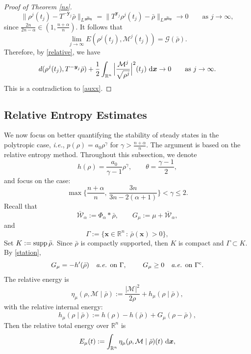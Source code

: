 \documentclass[reqno,11pt]{amsart}
\numberwithin{equation}{section}
\theoremstyle{definition}
\def\dd{{\, \rm d}}
\def\supp{{\rm supp}}
\begin{document}
\begin{proof}[Proof of Theorem \ref{ns}]
\begin{equation*}
 \| \rho^j(t_j) - T^{-\boldsymbol{y}_j} \bar{\rho} \|_{L^\frac{2n}{2n - \alpha}} 
 =  \| T^{\boldsymbol{y}_j} \rho^j(t_j) - \bar{\rho} \|_{L^\frac{2n}{2n - \alpha}} 
\rightarrow 0 \qquad\mbox{as $j \to \infty$},
\end{equation*}
since $\frac{2n}{2n - \alpha} \in (1, \frac{n + \alpha}{n})$. 
It follows that
\begin{equation*}
 \lim_{j \to \infty} E(\rho^j(t_j),\mathcal{M}^j(t_j)) = \mathcal{G}(\bar{\rho}).
\end{equation*}
Therefore, by \eqref{relative}, we have 
\begin{equation*}
 d(\rho^j(t_j),T^{-\boldsymbol{y}_j}\bar{\rho}) 
 + \frac{1}{2}\int_{\mathbb{R}^n}   
 \Big|\frac{\mathcal{M}^j}{\sqrt{\rho^j}}\Big|^2(t_j)\,\dd \boldsymbol{x} \rightarrow 0 
 \qquad \mbox{as $j \to \infty$}. 
\end{equation*}
This is a contradiction to \eqref{auxx}.
\end{proof}

\subsection{Relative Entropy Estimates}
We now focus on better quantifying the stability of steady states in the polytropic case, {\it i.e.}, $p(\rho) = a_0 \rho^\gamma$ for $\gamma > \frac{n + \alpha}{n}$. The argument is based on the relative entropy method. Throughout this subsection, we denote
\[ h(\rho)=\frac{a_0}{\gamma-1}\rho^\gamma,\qquad\theta=\frac{\gamma-1}{2},
\]
and focus on the case:
\[\max\big\{\frac{n+\alpha}{n},\,\frac{3n}{3n-2(\alpha+1)}\big\}<\gamma\le2.
\]
Recall that
\[\bar{\mathcal W}_\alpha:=\Phi_\alpha*\bar\rho, \qquad
 G_\mu:=\mu+\bar{\mathcal W}_\alpha,
\]
and 
$$ \Gamma:=\{\boldsymbol{x}\in\mathbb R^n\,:\,\bar\rho(\boldsymbol{x})>0\},$$
Set $K:=\supp  \,\bar \rho.$ 
Since $\bar\rho$ is compactly supported, then $K$ is compact and $\Gamma\subset K.$ 
By \eqref{station},
\begin{equation}\label{property}
G_\mu=-h'(\bar\rho)\quad\hbox{{\it a.e. }on } \Gamma, \qquad\,\, G_\mu\ge0\quad\hbox{{\it a.e. }on }\Gamma^{\rm c}.
\end{equation}
The relative energy is
$$
\eta_\mu(\rho,\mathcal M\mid\bar\rho) :=\frac{|\mathcal M|^2}{2\rho}+h_\mu(\rho\mid\bar\rho),
$$
with 
the relative internal energy:
\begin{equation}\nonumber
h_\mu(\rho\mid\bar\rho):=h(\rho)-h(\bar\rho)+G_\mu(\rho-\bar\rho),
\end{equation}
Then the relative total energy over $\mathbb{R}^n$ is
$$
E_\mu(t):=\int_{\mathbb R^n}\eta_\mu(\rho,\mathcal M\mid\bar\rho)(t)\,\dd\boldsymbol{x},
$$
\end{document}

